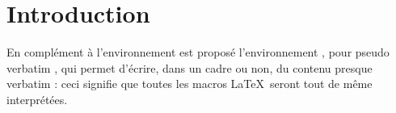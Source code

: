 \documentclass[12pt,a4paper]{article}
\begin{document}
\section{Introduction}

En complément à l'environnement  est proposé l'environnement , pour \og pseudo verbatim \fg, qui permet d'écrire, dans un cadre ou non, du contenu presque verbatim : ceci signifie que toutes les macros \LaTeX\ seront tout de même interprétées. 
\end{document}
